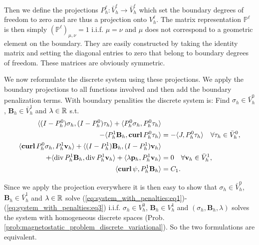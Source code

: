 \documentclass[../master_thesis.tex]{subfiles}
\begin{document}
Then we define the 
projections $P_h^\ell: \bar{V}_h^\ell \rightarrow \bar{V}_h^\ell$ which set 
the boundary degrees of freedom to zero and are thus 
a projection onto $V_h^\ell$. The
matrix representation $\mathbb{P}^\ell$ is then simply
$(\mathbb{P}^\ell)_{\mu, \nu} = 1 $ i.i.f. $\mu = \nu$ and $\mu$ does not 
correspond to a geometric element on the boundary. 
They are easily constructed 
by taking the identity matrix and setting the diagonal entries to zero that 
belong to boundary degrees of freedom. These matrices are obviously symmetric.

We now reformulate the discrete system using these projections. We apply the boundary projections 
to all functions involved and then add the boundary penalization terms.
With boundary penalities the discrete system is: Find $\sigma_h \in \bar{V}_h^0$, 
$\mathbf{B}_h \in \bar{V}^1_h$ and $\lambda \in \mathbb{R}$ s.t.
\begin{align}
    \langle (I-P^0_h)\sigma_h, (I-P^0_h)\tau_h \rangle 
    + \langle P^0_h \sigma_h, P^0_h\tau_h \rangle& \notag
    \\- \langle P^1_h \mathbf{B}_h,\veccurl P^0_h\tau_h \rangle 
    &=  -\langle J, P^0_h \tau_h \rangle \quad \forall \tau_h \in \bar{V}_h^0, \label{eq:system_with_penalties:eq1}
    \\ \langle \veccurl P^0_h \sigma_h, P^1_h\mathbf{v}_h \rangle 
        + \langle (I-P^1_h)\mathbf{B}_h, (I-P^1_h)\mathbf{v}_h \rangle& \notag
      \\+ \langle \diver P^1_h\mathbf{B}_h, \diver P^1_h\mathbf{v}_h \rangle 
         + \langle \lambda \mathbf{p}_h, P^1_h\mathbf{v}_h \rangle 
    &= 0 \quad \forall \mathbf{v}_h \in \bar{V}^1_h, \label{eq:system_with_penalties:eq2}
    \\ \langle \bm{\curl} \psi, P^1_h \mathbf{B}_h \rangle &= C_1 .
        \label{eq:system_with_penalties:eq3}
\end{align}

Since we apply the projection everywhere it is then easy to show that 
$\sigma_h \in \bar{V}_h^0$, 
$\mathbf{B}_h \in \bar{V}^1_h$ and $\lambda \in \mathbb{R}$ solve 
(\ref{eq:system_with_penalties:eq1})-(\ref{eq:system_with_penalties:eq3})
i.i.f. $\sigma_h \in V_h^0$, $\mathbf{B}_h \in V^1_h$ 
and $(\sigma_h,\mathbf{B}_h,\lambda)$ solves the system with homogeneous discrete spaces 
(Prob.\,\ref{prob:magnetostatic_problem_discrete_variational}). 
So the two formulations are equivalent.
\end{document}
